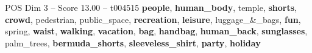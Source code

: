 \begin{textsample}{POS Dim 3 – Score 13.00 – t004515}  \label{ex:f3_pos_037}
\textbf{people}, \textbf{human\_body}, temple, \textbf{shorts}, \textbf{crowd}, pedestrian, public\_space, \textbf{recreation}, \textbf{leisure}, luggage\_\&\_bags, \textbf{fun}, spring, \textbf{waist}, \textbf{walking}, \textbf{vacation}, \textbf{bag}, \textbf{handbag}, \textbf{human\_back}, \textbf{sunglasses}, palm\_trees, \textbf{bermuda\_shorts}, \textbf{sleeveless\_shirt}, \textbf{party}, \textbf{holiday}

\end{textsample}
